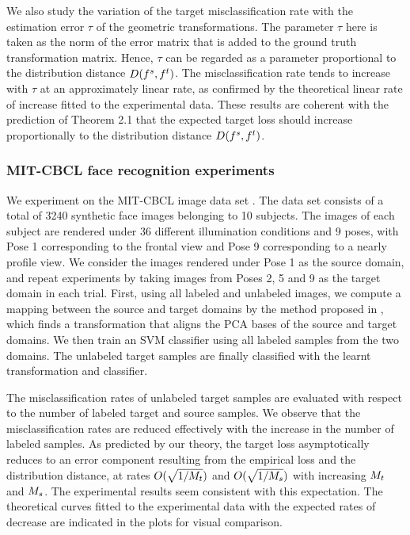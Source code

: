 \documentclass[review,supplement,onefignum,onetabnum]{siamonline250211}
\begin{document}
We also study the variation of the target misclassification rate with the estimation error $\tau$ of the geometric transformations. The parameter $\tau$ here is taken as the norm of the error matrix that is added to the ground truth transformation matrix. Hence, $\tau$ can be regarded as a parameter proportional to the distribution distance  $D(f^s, f^t)$. The misclassification rate tends to increase with $\tau$ at an approximately linear rate, as confirmed by the theoretical linear rate of increase fitted to the experimental data. These results are coherent with the prediction of Theorem 2.1 that the expected target loss should increase proportionally to the distribution distance $D(f^s, f^t)$.

\subsubsection{MIT-CBCL face recognition experiments}

We experiment on the MIT-CBCL image data set \cite{MITCBCL}. The data set consists of a total of 3240 synthetic face images belonging to 10 subjects. The images of each subject are rendered under 36 different illumination conditions and 9 poses, with Pose 1 corresponding to the frontal view and Pose 9 corresponding to a nearly profile view. We consider the images rendered under Pose 1 as the source domain, and repeat experiments by taking images from Poses 2, 5 and 9 as the target domain in each trial. First, using all labeled and unlabeled images, we compute a mapping between the source and target domains by the method proposed in \cite{FernandoHST13}, which finds a transformation that aligns the PCA bases of the source and target domains. We then train an SVM classifier using all labeled samples from the two domains. The unlabeled target samples are finally classified with the learnt transformation and classifier.

The misclassification rates of unlabeled target samples are evaluated with respect to the number of labeled target and source samples. We observe that the misclassification rates are reduced effectively with the increase in the number of labeled samples. As predicted by our theory, the target loss asymptotically reduces to an error component resulting from the empirical loss and the distribution distance, at rates $O(\sqrt{1/M_t})$ and $O(\sqrt{1/M_s})$ with increasing $M_t$ and $M_s$. The experimental results seem consistent with this expectation.  The theoretical curves fitted to the experimental data with the expected rates of decrease are indicated in the plots for visual comparison.
\end{document}
